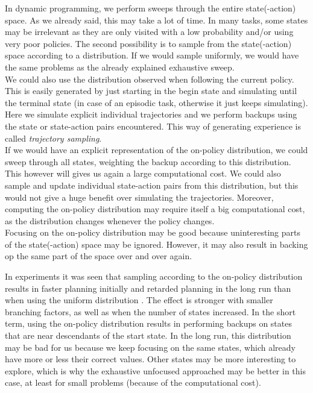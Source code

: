 \documentclass[a4paper]{article}
\begin{document}
In dynamic programming, we perform sweeps through the entire state(-action) space. As we already said, this may take a lot of time. In many tasks, some states may be irrelevant as they are only visited with a low probability and/or using very poor policies. The second possibility is to sample from the state(-action) space according to a distribution. If we would sample uniformly, we would have the same problems as the already explained exhaustive sweep.\\
We could also use the distribution observed when following the current policy. This is easily generated by just starting in the begin state and simulating until the terminal state (in case of an episodic task, otherwise it just keeps simulating). Here we simulate explicit individual trajectories and we perform backups using the state or state-action pairs encountered. This way of generating experience is called \textit{trajectory sampling}.\\
If we would have an explicit representation of the on-policy distribution, we could sweep through all states, weighting the backup according to this distribution. This however will gives us again a large computational cost. We could also sample and update individual state-action pairs from this distribution, but this would not give a huge benefit over simulating the trajectories. Moreover, computing the on-policy distribution may require itself a big computational cost, as the distribution changes whenever the policy changes.\\
Focusing on the on-policy distribution may be good because uninteresting parts of the state(-action) space may be ignored. However, it may also result in backing op the same part of the space over and over again.

In experiments it was seen that sampling according to the on-policy distribution results in faster planning initially and retarded planning in the long run than when using the uniform distribution \citep{ML}. The effect is stronger with smaller branching factors, as well as when the number of states increased. In the short term, using the on-policy distribution results in performing backups on states that are near descendants of the start state. In the long run, this distribution may be bad for us because we keep focusing on the same states, which already have more or less their correct values. Other states may be more interesting to explore, which is why the exhaustive unfocused approached may be better in this case, at least for small problems (because of the computational cost).\\
\end{document}
